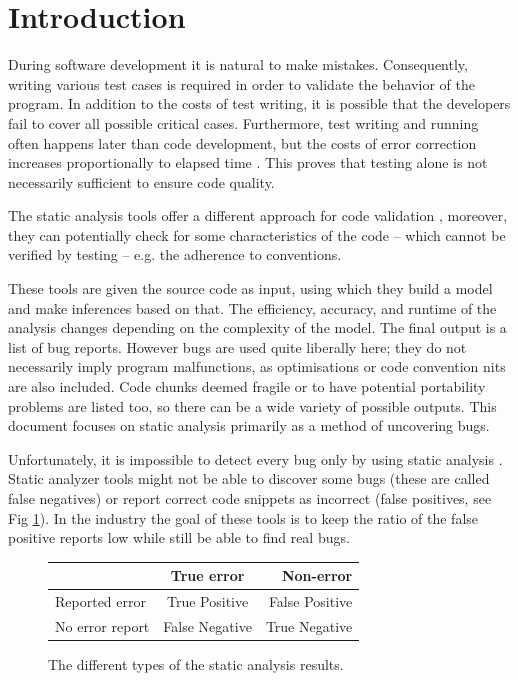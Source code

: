 \documentclass[oneside, a4paper, 12pt]{article}
\theoremstyle{definition}
\begin{document}
\section{Introduction}
During software development it is natural to make mistakes. Consequently,
writing various test cases is required in order to validate the behavior
of the program. In addition to the costs of test writing, it is possible that the developers fail
to cover all possible critical cases. Furthermore, test writing and running
often happens later than code development, but the costs of error correction
increases proportionally to elapsed time  \cite{fixcost}. This proves that 
testing alone is not necessarily sufficient to ensure code quality.  %

The static analysis tools offer a different approach for code validation 
\cite{Zhivich2009} \cite{Bessey2010}, moreover, they can potentially check for 
some characteristics of the code -- which cannot be verified by testing -- e.g. 
the adherence to conventions.

These tools are given the source code as input, using which they build a model 
and make inferences based on that. The efficiency, accuracy, and runtime of the 
analysis changes depending on the complexity of the model.
The final output is a list of bug reports. However bugs are used quite 
liberally here; they do not necessarily imply program malfunctions, as 
optimisations or code convention nits are also included. Code chunks deemed 
fragile or to have potential portability problems are listed too, so there can 
be a wide variety of possible outputs.
This document focuses on static analysis primarily as a method of uncovering 
bugs.
 
Unfortunately, it is impossible to detect every 
bug only by using static analysis \cite{Rice:53}. Static analyzer tools might 
not be able to discover some bugs (these are called false negatives) or report 
correct code snippets as incorrect (false positives, see Fig \ref{fig:bes}). In 
the industry the goal of these tools is to keep the ratio of the false positive 
reports low while still be able to find real bugs.

\begin{figure}[!h]
	\begin{center}
		\begin{tabular}{ | l | c | r | }
			\hline
			& True error   & Non-error \\ \hline
			Reported error   & True Positive  & False Positive   \\ \hline
			No error report & False Negative & True Negative    \\
			\hline
		\end{tabular}
	\end{center}
	\caption{The different types of the static analysis results.}
	\label{fig:bes}
\end{figure}
\end{document}
